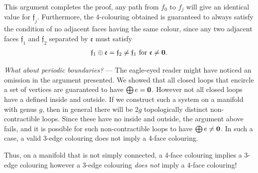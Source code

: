 This argument completes the proof, any path from $f_0$ to $f_j$ will give an identical value for $\mathfrak f_j$. Furthermore, the 4-colouring obtained is guaranteed to always satisfy the condition of no adjacent faces having the same colour, since any two adjacent faces $\mathfrak f_1$ and $\mathfrak f_2$ separated by $\mathfrak e$ must satisfy 
\begin{align}
    \mathfrak f_1 \oplus \mathfrak e = \mathfrak f_2 \neq \mathfrak f_1 \textup{ for } \mathfrak e \neq \textbf 0.
\end{align}

\begin{shaded}
    {\it What about periodic boundaries?} --- 
    The eagle-eyed reader might have noticed an omission in the argument presented. We showed that all closed loops that encircle a set of vertices are guaranteed to have $\bigoplus e = \textbf 0$. However not all closed loops have a defined inside and outside. If we construct such a system on a manifold with genus $g$, then in general there will be $2g$ topologically distinct non-contractible loops. Since these have no inside and outside, the argument above fails, and it is possible for such non-contractible loops to have $\bigoplus e \neq \textbf 0$. In such a case, a valid 3-edge colouring does not imply a 4-face colouring. 

    Thus, on a manifold that is not simply connected, a 4-face colouring implies a 3-edge colouring however a 3-edge colouring \textit{does not} imply a 4-face colouring!
\end{shaded}

